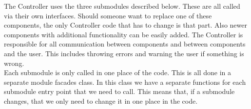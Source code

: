 \documentclass[../Main.tex]{subfiles}
\begin{document}
The Controller uses the three submodules described below. These are all called via their own interfaces. Should someone want to replace one of these components, the only Controller code that has to change is that part. Also newer components with additional functionality can be easily added. The Controller is responsible for all communication between components and between components and the user. This includes throwing errors and warning the user if something is wrong.\\
Each submodule is only called in one place of the code. This is all done in a separate module facades class. In this class we have a separate functions for each submodule entry point that we need to call. This means that, if a submodule changes, that we only need to change it in one place in the code.
\end{document}
